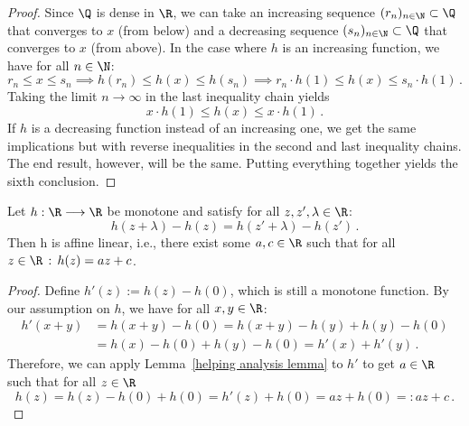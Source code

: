 \begin{proof}
Since $\Q$ is dense in $\R$, we can take an increasing sequence $(r_n)_{n \in \N} \subset \Q$ that converges to $x$ (from below) and a decreasing sequence $(s_n)_{n \in \N} \subset \Q$ that converges to $x$ (from above). In the case where $h$ is an increasing function, we have for all $n \in \N$:
\[ r_n \leq x \leq s_n \implies h(r_n) \leq h(x) \leq h(s_n) \implies r_n \cdot h(1) \leq h(x) \leq s_n \cdot h(1) \, .\]
Taking the limit $n \rightarrow \infty$ in the last inequality chain yields
\[ x \cdot h(1) \leq h(x) \leq x \cdot h(1) \, .\]
If $h$ is a decreasing function instead of an increasing one, we get the same implications but with reverse inequalities in the second and last inequality chains. The end result, however, will be the same. Putting everything together yields the sixth conclusion.

\end{proof}

\begin{cor*}
\label{app:affine linearity corollary}
Let $h: \R \longrightarrow \R$ be monotone and satisfy for all $z,z',\lambda \in \R$:
\begin{equation}
\label{distance preserving}
h(z+\lambda) - h(z) = h(z' + \lambda) - h(z') \, .
\end{equation} 
Then h is affine linear, i.e., there exist some $a,c \in \R$ such that for all $z \in \R\, : \, h(z) = az + c$.
\end{cor*}
\begin{proof} 
Define $h'(z):=h(z) - h(0)$, which is still a monotone function. By our assumption on $h$, we have for all $x,y \in \R$:
\begin{align*}
h'(x+y) &= h(x+y)-h(0) = h(x+y) - h(y) + h(y) - h(0) \\
&= h(x) - h(0) + h(y) - h(0) = h'(x) + h'(y) \, .
\end{align*}
Therefore, we can apply Lemma~\ref{helping analysis lemma} to $h'$ to get $a \in \R$ such that for all $z \in \R$ 
\[h(z) = h(z) - h(0) + h(0) = h'(z) + h(0) = az + h(0) =: az + c \, .\]
\end{proof}


